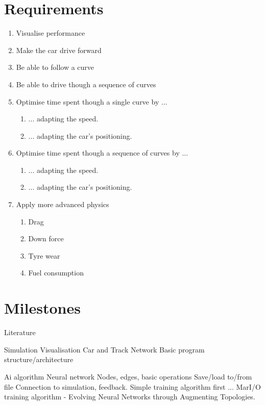 \section{Requirements}
\begin{enumerate}
  \item Visualise performance
  \item Make the car drive forward
  \item Be able to follow a curve
  \item Be able to drive though a sequence of curves
  \item Optimise time spent though a single curve by ...
    \begin{enumerate}
        \item ... adapting the speed.
        \item ... adapting the car's positioning.
    \end{enumerate}
  \item Optimise time spent though a sequence of curves by ...
    \begin{enumerate}
        \item ... adapting the speed.
        \item ... adapting the car's positioning.
    \end{enumerate}
    \item Apply more advanced physics
    \begin{enumerate}
        \item Drag
        \item Down force
        \item Tyre wear
        \item Fuel consumption
    \end{enumerate}
\end{enumerate}

\section{Milestones}
Literature

Simulation
Visualisation
    Car and Track
    Network
Basic program structure/architecture

Ai algorithm
    Neural network
        Nodes, edges, basic operations
        Save/load to/from file
    Connection to simulation, feedback.
    Simple training algorithm first
    ...
    MarI/O training algorithm - Evolving Neural Networks through Augmenting Topologies. 